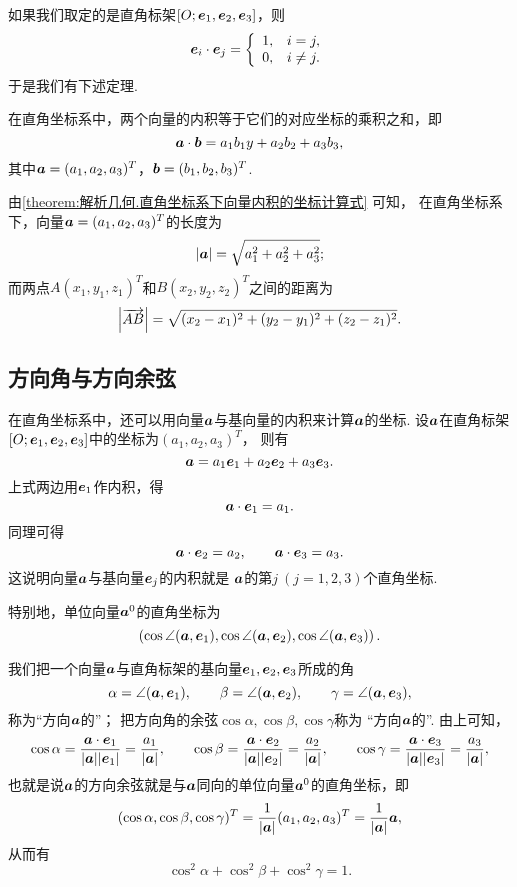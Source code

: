 如果我们取定的是直角标架\([O;\boldsymbol{e}_1,\boldsymbol{e}_2,\boldsymbol{e}_3]\)，则\[
	\boldsymbol{e}_i \cdot \boldsymbol{e}_j = \left\{ \begin{array}{ll}
		1, & i = j, \\
		0, & i \neq j.
	\end{array} \right.
\]
于是我们有下述定理.
\begin{theorem}\label{theorem:解析几何.直角坐标系下向量内积的坐标计算式}
在直角坐标系中，两个向量的内积等于它们的对应坐标的乘积之和，即
\begin{equation}
	\boldsymbol{a}\cdot\boldsymbol{b}
	= a_1 b_1 y + a_2 b_2 + a_3 b_3,
\end{equation}
其中\(\boldsymbol{a}=(a_1,a_2,a_3)^T\)，\(\boldsymbol{b}=(b_1,b_2,b_3)^T\).
\end{theorem}

由\cref{theorem:解析几何.直角坐标系下向量内积的坐标计算式} 可知，
在直角坐标系下，向量\(\boldsymbol{a}=(a_1,a_2,a_3)^T\)的长度为\begin{equation}
	\abs{\boldsymbol{a}} = \sqrt{a_1^2+a_2^2+a_3^2};
\end{equation}
而两点\(A(x_1,y_1,z_1)^T\)和\(B(x_2,y_2,z_2)^T\)之间的距离为\begin{equation}
	\abs{\overrightarrow{AB}} = \sqrt{(x_2-x_1)^2+(y_2-y_1)^2+(z_2-z_1)^2}.
\end{equation}

\subsection{方向角与方向余弦}
在直角坐标系中，还可以用向量\(\boldsymbol{a}\)与基向量的内积来计算\(\boldsymbol{a}\)的坐标.
设\(\boldsymbol{a}\)在直角标架\([O;\boldsymbol{e}_1,\boldsymbol{e}_2,\boldsymbol{e}_3]\)中的坐标为\((a_1,a_2,a_3)^T\)，
则有\[
	\boldsymbol{a}=a_1 \boldsymbol{e}_1 + a_2 \boldsymbol{e}_2 + a_3 \boldsymbol{e}_3.
\]
上式两边用\(\boldsymbol{e}_1\)作内积，得\[
	\boldsymbol{a}\cdot\boldsymbol{e}_1 = a_1.
\]
同理可得\[
	\boldsymbol{a}\cdot\boldsymbol{e}_2 = a_2, \qquad
	\boldsymbol{a}\cdot\boldsymbol{e}_3 = a_3.
\]
这说明向量\(\boldsymbol{a}\)与基向量\(\boldsymbol{e}_j\)的内积就是
\(\boldsymbol{a}\)的第\(j\ (j=1,2,3)\)个直角坐标.

特别地，单位向量\(\boldsymbol{a}^0\)的直角坐标为\[
	\left( \cos\angle(\boldsymbol{a},\boldsymbol{e}_1),
	\cos\angle(\boldsymbol{a},\boldsymbol{e}_2),
	\cos\angle(\boldsymbol{a},\boldsymbol{e}_3) \right).
\]

我们把一个向量\(\boldsymbol{a}\)与直角标架的基向量\(\boldsymbol{e}_1,\boldsymbol{e}_2,\boldsymbol{e}_3\)所成的角\[
	\alpha=\angle(\boldsymbol{a},\boldsymbol{e}_1), \qquad
	\beta=\angle(\boldsymbol{a},\boldsymbol{e}_2), \qquad
	\gamma=\angle(\boldsymbol{a},\boldsymbol{e}_3),
\]称为“方向\(\boldsymbol{a}\)的”；
把方向角的余弦\(\cos\alpha,\cos\beta,\cos\gamma\)称为
“方向\(\boldsymbol{a}\)的”.
由上可知，\[
	\cos\alpha
	= \frac{\boldsymbol{a}\cdot\boldsymbol{e}_1}{\abs{\boldsymbol{a}}\abs{\boldsymbol{e}_1}}
	= \frac{a_1}{\abs{\boldsymbol{a}}},
	\qquad
	\cos\beta
	= \frac{\boldsymbol{a}\cdot\boldsymbol{e}_2}{\abs{\boldsymbol{a}}\abs{\boldsymbol{e}_2}}
	= \frac{a_2}{\abs{\boldsymbol{a}}},
	\qquad
	\cos\gamma
	= \frac{\boldsymbol{a}\cdot\boldsymbol{e}_3}{\abs{\boldsymbol{a}}\abs{\boldsymbol{e}_3}}
	= \frac{a_3}{\abs{\boldsymbol{a}}},
\]
也就是说\(\boldsymbol{a}\)的方向余弦就是与\(\boldsymbol{a}\)同向的单位向量\(\boldsymbol{a}^0\)的直角坐标，即\[
	(\cos\alpha,\cos\beta,\cos\gamma)^T
	= \frac{1}{\abs{\boldsymbol{a}}} (a_1,a_2,a_3)^T
	= \frac{1}{\abs{\boldsymbol{a}}} \boldsymbol{a},
\]
从而有\[
	\cos^2\alpha+\cos^2\beta+\cos^2\gamma=1.
\]

